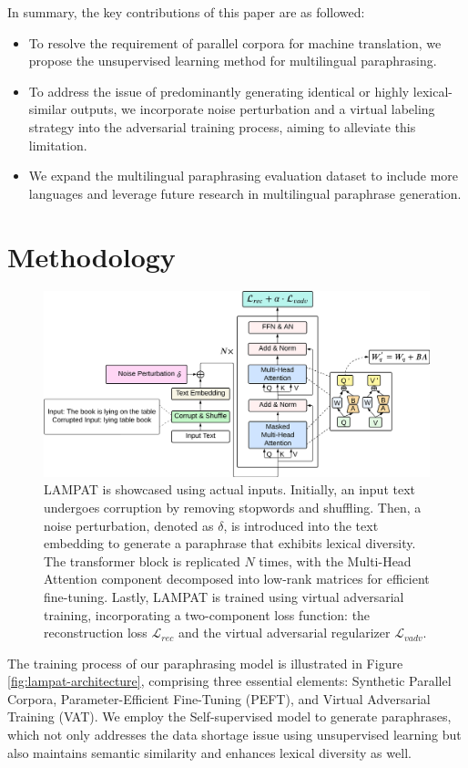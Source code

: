 \documentclass[letterpaper]{article} %
\begin{document}
In summary, the key contributions of this paper are as followed:
\begin{itemize}
    \item To resolve the requirement of parallel corpora for machine translation, we propose the unsupervised learning method for multilingual paraphrasing.
    \item To address the issue of predominantly generating identical or highly lexical-similar outputs, we incorporate noise perturbation and a virtual labeling strategy into the adversarial training process, aiming to alleviate this limitation.
    \item We expand the multilingual paraphrasing evaluation dataset to include more languages and leverage future research in multilingual paraphrase generation.
\end{itemize}

\section{Methodology}
\label{section:lampat}

\begin{figure}[h]
    \centering
    \includegraphics[width=0.72\linewidth]{images/architecture_2.png}
    \caption{LAMPAT is showcased using actual inputs. Initially, an input text undergoes corruption by removing stopwords and shuffling. Then, a noise perturbation, denoted as $\delta$, is introduced into the text embedding to generate a paraphrase that exhibits lexical diversity. The transformer block is replicated $N$ times, with the Multi-Head Attention component decomposed into low-rank matrices for efficient fine-tuning. Lastly, LAMPAT is trained using virtual adversarial training, incorporating a two-component loss function: the reconstruction loss $\mathcal{L}_{rec}$ and the virtual adversarial regularizer $\mathcal{L}_{vadv}$.}
    \label{fig:detail-lampat-architecture}
\end{figure}

The training process of our paraphrasing model is illustrated in Figure \ref{fig:lampat-architecture}, comprising three essential elements: Synthetic Parallel Corpora, Parameter-Efficient Fine-Tuning (PEFT), and Virtual Adversarial Training (VAT). We employ the Self-supervised model to generate paraphrases, which not only addresses the data shortage issue using unsupervised learning but also maintains semantic similarity and enhances lexical diversity as well.
\end{document}
